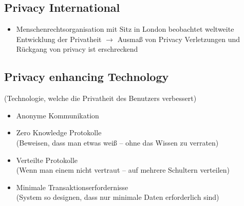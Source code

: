 \documentclass{article} %
\begin{document}
		\subsection{Privacy International}
	\begin{itemize}
		\item Menschenrechtsorganisation mit Sitz in London beobachtet weltweite Entwicklung der Privatheit $\rightarrow$ Ausmaß von Privacy Verletzungen und Rückgang von privacy ist erschreckend
	\end{itemize}
		
		\subsection{Privacy enhancing Technology}
		(Technologie, welche die Privatheit des Benutzers verbessert)
	\begin{itemize}
		\item Anonyme Kommunikation
		\item Zero Knowledge Protokolle\\
		(Beweisen, dass man etwas weiß – ohne das Wissen zu verraten)
		\item Verteilte Protokolle\\
		(Wenn man einem nicht vertraut – auf mehrere Schultern verteilen)
		\item Minimale Transaktionserfordernisse\\
		(System so designen, dass nur minimale Daten erforderlich sind)
	\end{itemize}
\end{document}
